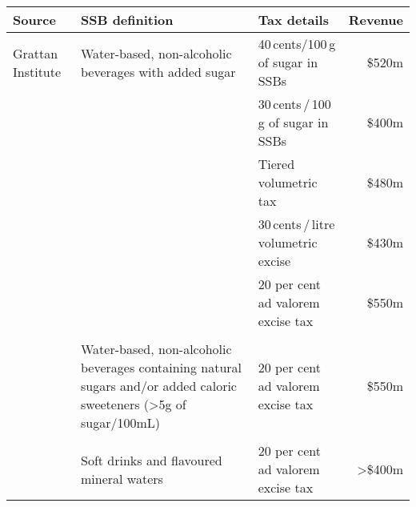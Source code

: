 \bgroup
\def\arraystretch{1.5}
\def\rowSpace{-4pt}
\begin{tabularx}{\columnwidth}{p{2.5cm}X>{\raggedright}p{2.6cm}r}
\toprule
\textbf{Source  } & \textbf{SSB definition} & \textbf{Tax details} & \textbf{Revenue} \\ 
\midrule
Grattan Institute & Water-based, non-alcoholic beverages with added sugar & 40\,cents/100\,g of sugar in SSBs & \$520m \\
 &  & 30\,cents\,/\,100\,g of sugar in SSBs        & \$400m \\
 &  & Tiered volumetric tax                & \$480m \\
 &  & 30\,cents\,/\,litre volumetric excise & \$430m \\
 &  & 20 per cent ad valorem excise tax           & \$550m \\
 & & & \\[\rowSpace]
\textcite{Office2016PolicycostingAustralian} & Water-based, non-alcoholic beverages containing natural sugars and/or added caloric sweeteners (\textgreater{}5g of sugar/100mL)  & 20 per cent ad valorem excise tax & \$550m \\
& & & \\[\rowSpace]
\textcite{Veerman2016ImpactTaxSugar} & Soft drinks and flavoured mineral waters & 20 per cent ad valorem excise tax& \textgreater{}\$400m \\
\bottomrule
\end{tabularx}
\egroup